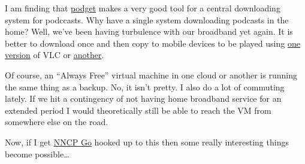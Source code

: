 I am finding that \href{https://github.com/dvehrs/podget}{podget} makes
a very good tool for a central downloading system for podccasts. Why
have a single system downloading podcasts in the home? Well, we've been
having turbulence with our broadband yet again. It is better to download
once and then copy to mobile devices to be played using
\href{http://www.videolan.org/vlc/download-appletv.html}{one version} of
VLC or \href{http://www.videolan.org/vlc/download-ios.html}{another}.

Of course, an ``Always Free'' virtual machine in one cloud or another is
running the same thing as a backup. No, it isn't pretty. I also do a lot
of commuting lately. If we hit a contingency of not having home
broadband service for an extended period I would theoretically still be
able to reach the VM from somewhere else on the road.

Now, if I get \href{http://www.nncpgo.org/}{NNCP Go} hooked up to this
then some really interesting things become possible\ldots{}
